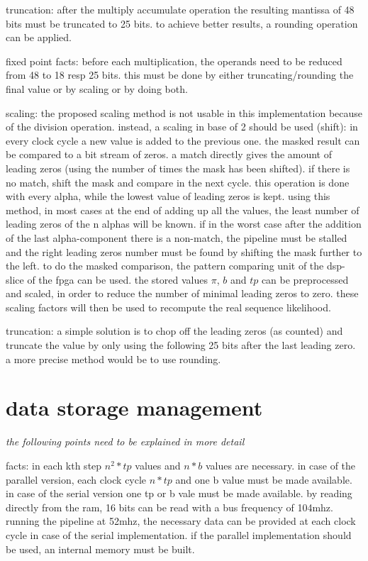 \documentclass[mscthesis]{usiinfthesis}
\begin{document}
truncation: after the multiply accumulate operation the resulting mantissa of
48 bits must be truncated to 25 bits. to achieve better results, a rounding
operation can be applied.

fixed point facts:
before each multiplication, the operands need to be reduced from 48 to 18 resp
25 bits. this must be done by either truncating/rounding the final value or by
scaling or by doing both.

scaling: the proposed scaling method is not usable in this implementation
because of the division operation. instead, a scaling in base of 2 should be
used (shift): in every clock cycle a new value is added to the previous one.
the masked result can be compared to a bit stream of zeros. a match directly
gives the amount of leading zeros (using the number of times the mask has been
shifted). if there is no match, shift the mask and compare in the next cycle.
this operation is done with every alpha, while the lowest value of leading
zeros is kept. using this method, in most cases at the end of adding up all the
values, the least number of leading zeros of the n alphas will be known. if in
the worst case after the addition of the last alpha-component there is
a non-match, the pipeline must be stalled and the right leading zeros number
must be found by shifting the mask further to the left. to do the masked
comparison, the pattern comparing unit of the dsp-slice of the fpga can be
used. the stored values $ \pi $, $ b $ and $ tp $ can be preprocessed and
scaled, in order to reduce the number of minimal leading zeros to zero. these
scaling factors will then be used to recompute the real sequence likelihood.

truncation: a simple solution is to chop off the leading zeros (as counted) and
truncate the value by only using the following 25 bits after the last leading
zero. a more precise method would be to use rounding.

\section{data storage management}

\emph{\color{red}the following points need to be explained in more detail}

facts:
in each kth step $ n^2*tp $ values and $ n*b $ values are necessary. in case of
the parallel version, each clock cycle $ n*tp $ and one b value must be made
available. in case of the serial version one tp or b vale must be made
available. by reading directly from the ram, 16 bits can be read with a bus
frequency of 104mhz. running the pipeline at 52mhz, the necessary data can be
provided at each clock cycle in case of the serial implementation. if the
parallel implementation should be used, an internal memory must be built.
\end{document}
